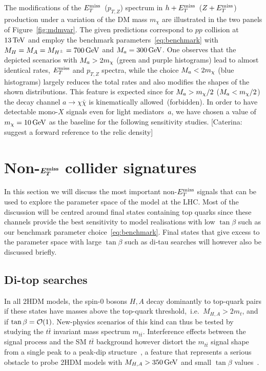 The modifications of the $E_T^\mathrm{miss}$~($p_{T,Z}$) spectrum in $h+E_T^\mathrm{miss}$~($Z+E_T^\mathrm{miss}$) production under a variation of the DM mass $m_\chi$ are illustrated in the two panels of Figure~\ref{fig:mdmvar}. The given predictions correspond to $pp$ collision at $13 \, {\rm TeV}$ and employ the benchmark parameters~\eqref{eq:benchmark} with $M_{H} = M_{A} = M_{H^{\pm}} = 700 \, {\rm GeV}$ and $M_{a} = 300 \, {\rm GeV}$. One observes that the depicted scenarios with $M_{a}  > 2 m_\chi$ (green and purple histograms) lead to almost identical rates, $E_T^\mathrm{miss}$ and $p_{T,Z}$ spectra, while the choice $M_{a}  < 2 m_\chi$ (blue histograms) 
largely reduces the total rates and also modifies the shapes of the shown distributions. This feature is expected since for $M_{a} > m_\chi/2$ ($M_{a} < m_\chi/2$) the decay channel $a \to \chi \bar \chi$ is kinematically allowed~(forbidden). In order to have detectable mono-$X$ signals even for light mediators~$a$, we have chosen a value of  $m_\chi = 10 \, {\rm GeV}$ as the baseline for the following sensitivity studies. {\color{red} [Caterina: suggest a forward reference to the relic density]}

\section{Non-$\mbox{\boldmath$E_T^{\rm miss}$\unboldmath}$ collider signatures}
\label{sec:nonMET}

In this section we will discuss the most important non-$E_T^\mathrm{miss}$ signals that can be used to explore the parameter space of the \hdma model at the LHC. Most of the discussion will be centred around final states containing top quarks since these channels provide the best sensitivity to model realisations with low $\tan \beta$ such as our benchmark parameter choice~\eqref{eq:benchmark}. Final states that give excess to the \hdma parameter space with large $\tan \beta$ such as di-tau searches will however also be discussed briefly. 

\subsection{Di-top  searches}
\label{sec:ttbarresonances}

In all 2HDM models, the spin-0 bosons $H,A$  decay dominantly to top-quark pairs if these states have masses above the top-quark threshold,~i.e.~$M_{H, A} > 2 m_t$, and if $\tan \beta = {\cal O}(1)$. New-physics scenarios of this kind can thus be tested by studying the $t \bar t$ invariant mass spectrum $m_{t \bar t}$.  Interference effects between the signal process and the SM  $t \bar t$ background however distort the $m_{t \bar t}$ signal shape from a single peak to a peak-dip structure~\cite{Gaemers:1984sj,Dicus:1994bm,Bernreuther:1997gs,Frederix:2007gi,Hespel:2016qaf}, a feature that represents a serious obstacle to probe 2HDM models with $M_{H,A} > 350 \, {\rm GeV}$ and small $\tan \beta$ values~\cite{Craig:2015jba,Hajer:2015gka,Gori:2016zto,Carena:2016npr}. 

